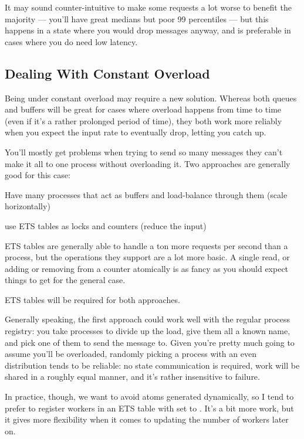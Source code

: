It may sound counter-intuitive to make some requests a lot worse to benefit the majority — you'll have great medians but poor 99 percentiles — but this happens in a state where you would drop messages anyway, and is preferable in cases where you do need low latency.

\subsection{Dealing With Constant Overload}

Being under constant overload may require a new solution. Whereas both queues and buffers will be great for cases where overload happens from time to time (even if it's a rather prolonged period of time), they both work more reliably when you expect the input rate to eventually drop, letting you catch up.

You'll mostly get problems when trying to send so many messages they can't make it all to one process without overloading it. Two approaches are generally good for this case:

\begin{itemize*}
	\item Have many processes that act as buffers and load-balance through them (scale horizontally)
	\item use ETS tables as locks and counters (reduce the input)
\end{itemize*}

ETS tables are generally able to handle a ton more requests per second than a process, but the operations they support are a lot more basic. A single read, or adding or removing from a counter atomically is as fancy as you should expect things to get for the general case.

ETS tables will be required for both approaches.

Generally speaking, the first approach could work well with the regular process registry: you take  processes to divide up the load, give them all a known name, and pick one of them to send the message to. Given you're pretty much going to assume you'll be overloaded, randomly picking a process with an even distribution tends to be reliable: no state communication is required, work will be shared in a roughly equal manner, and it's rather insensitive to failure.

In practice, though, we want to avoid atoms generated dynamically, so I tend to prefer to register workers in an ETS table with  set to . It's a bit more work, but it gives more flexibility when it comes to updating the number of workers later on.

